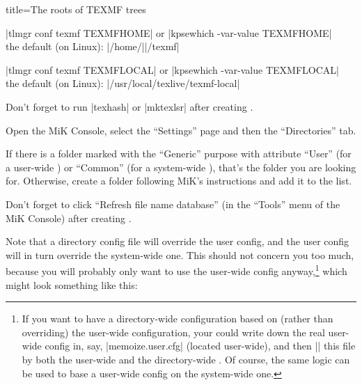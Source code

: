 \documentclass[a4paper,11pt]{article}
\begin{document}
\begin{tcboxedraster}
  [raster columns=1, raster valign=top, raster force size=false]
  {title=The roots of TEXMF trees}
\begin{tcolorbox}[title={\hologo{TeX} Live\hfill\url[white](https://){tug.org/texlive}}]
  \begin{description}[itemsep=0pt]
  \item[user-wide]
    |tlmgr conf texmf TEXMFHOME|
    or |kpsewhich -var-value TEXMFHOME|\\
    the default (on Linux): |/home/||/texmf|
  \item[system-wide]
    |tlmgr conf texmf TEXMFLOCAL|
    or |kpsewhich -var-value TEXMFLOCAL|\\
    the default (on Linux): |/usr/local/texlive/texmf-local|
  \end{description}

  \smallskip
  Don't forget to run |texhash| or |mktexlsr| after creating .
\end{tcolorbox}
\begin{tcolorbox}[title={MiK\hologo{TeX}\hfill\url[white](https://){miktex.org}}, before upper={\parskip0.3\baselineskip plus 2pt\relax},]
  Open the MiK Console, select the ``Settings'' page and then the
  ``Directories'' tab.

  If there is a folder marked with the ``Generic'' purpose with attribute
  ``User'' (for a user-wide ) or ``Common'' (for a system-wide
    ), that's the folder you are looking for.  Otherwise, create a
  folder following MiK's instructions and add it to the list.
  
  Don't forget to click ``Refresh file name database'' (in the ``Tools'' menu
    of the MiK Console) after creating .
\end{tcolorbox}
\end{tcboxedraster}

Note that a directory config file will override the user config, and the user
config will in turn override the system-wide one.  This should not concern you
too much, because you will probably only want to use the user-wide config
anyway,\cprotect\footnote{If you want to have a directory-wide configuration
  based on (rather than overriding) the user-wide configuration, your could
  write down the real user-wide config in, say, |memoize.user.cfg| (located
  user-wide), and then || this file by both the user-wide and the
  directory-wide .  Of course, the same logic can be used to base
  a user-wide config on the system-wide one.} which might look something like
this:
\end{document}
